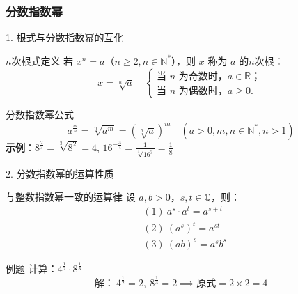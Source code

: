 \subsubsection{分数指数幂}
\begin{frame}{1. 根式与分数指数幂的互化}
    \begin{block}{$n$次根式定义}
        若 \( x^n = a \)（\( n \geq 2, n \in \mathbb{N}^* \)），则 \( x \) 称为 \( a \) 的$n$次根：
        \[
            x = \sqrt[n]{a} \quad 
            \begin{cases} 
            \text{当 } n \text{ 为奇数时，} a \in \mathbb{R}； \\
            \text{当 } n \text{ 为偶数时，} a \geq 0.
            \end{cases}
        \]
    \end{block}

    \begin{block}{分数指数幂公式}
        \[
        a^{\frac{m}{n}} = \sqrt[n]{a^m} = (\sqrt[n]{a})^m \quad (a > 0, m, n \in \mathbb{N}^*, n > 1)
        \]
        \vspace{0.5cm}
        \textbf{示例}：\( 8^{\frac{2}{3}} = \sqrt[3]{8^2} = 4 \), \( 16^{-\frac{3}{4}} = \frac{1}{\sqrt[4]{16^3}} = \frac{1}{8} \)
    \end{block}
\end{frame}

\begin{frame}{2. 分数指数幂的运算性质}
    \begin{block}{与整数指数幂一致的运算律}
        设 \( a, b > 0 \)，\( s, t \in \mathbb{Q} \)，则：
        \[
        \begin{aligned}
        &(1)\ a^s \cdot a^t = a^{s+t} \\
        &(2)\ (a^s)^t = a^{st} \\
        &(3)\ (ab)^s = a^s b^s
        \end{aligned}
        \]
    \end{block}

    \begin{exampleblock}{例题}
        计算：\( 4^{\frac{1}{2}} \cdot 8^{\frac{1}{3}} \)
        \[
        \text{解：} \ 4^{\frac{1}{2}} = 2, \ 8^{\frac{1}{3}} = 2 \implies \text{原式} = 2 \times 2 = 4
        \]
    \end{exampleblock}
\end{frame}







